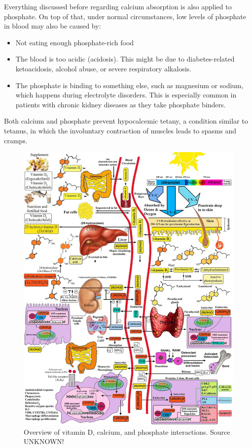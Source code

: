 Everything discussed before regarding calcium absorption is also applied to phosphate. On top of that, under normal circumstances, low levels of phosphate in blood may also be caused by:

\begin{itemize}

    \item Not eating enough phosphate-rich food
    
    \item The blood is too acidic (acidosis). This might be due to diabetes-related ketoacidosis, alcohol abuse, or severe respiratory alkalosis.
    
    \item The phosphate is binding to something else, such as magnesium or sodium, which happens during electrolyte disorders. This is especially common in patients with chronic kidney diseases as they take phosphate binders.
    
\end{itemize}

Both calcium and phosphate prevent hypocalcemic tetany, a condition similar to tetanus, in which the involuntary contraction of muscles leads to spasms and cramps.


\begin{figure}[h!]

    \centering
    \includegraphics[width=1\textwidth]{figures/Vitamin D/nihms502359f1.jpg}
    \caption{Overview of vitamin D, calcium, and phosphate interactions. Source UNKNOWN!}
    \label{fig:vitDPathways}

\end{figure}

